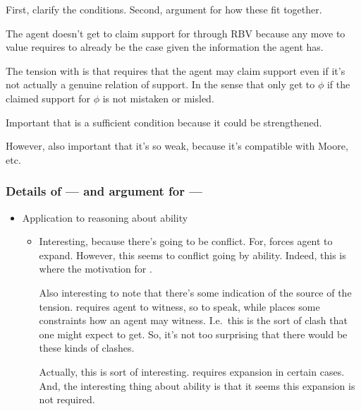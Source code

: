 \begin{note}[Structure]
  First, clarify the conditions.
  Second, argument for how these fit together.
\end{note}

\begin{note}
  The agent doesn't get to claim support for through RBV because any move to value requires to already be the case given the information the agent has.
\end{note}

\begin{note}
  The tension with \eiS{} is that \eiS{} requires that the agent may claim support even if it's not actually a genuine relation of support.
  In the sense that only get to \(\phi\) if the claimed support for \(\phi\) is not mistaken or misled.
\end{note}


\begin{note}
  Important that \nI{} is a sufficient condition because it could be strengthened.

  However, also important that it's so weak, because it's compatible with Moore, etc.\
\end{note}

\subsubsection{Details of --- and argument for --- \nI{}}
\label{sec:details-ni}

\begin{note}
  \color{red}
  \begin{itemize}
  \item Application to reasoning about ability
    \begin{itemize}
    \item Interesting, because there's going to be conflict.
      For, \nI{} forces agent to expand.
      However, this seems to conflict going by ability.
      Indeed, this is where the motivation for \EAS{}.

      {
        \color{green}
        Also interesting to note that there's some indication of the source of the tension.
        \ESU{} requires agent to witness, so to speak, while \nI{} places some constraints how an agent may witness.
        I.e.\ this is the sort of clash that one might expect to get.
        So, it's not too surprising that there would be these kinds of clashes.

        Actually, this is sort of interesting.
        \nI{} requires expansion in certain cases.
        And, the interesting thing about ability is that it seems this expansion is not required.
      }
    \end{itemize}
  \end{itemize}
\end{note}


